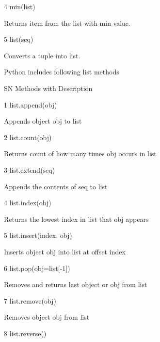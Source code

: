 4 \hspace*{0.5in} min(list) \par
\vspace{12pt}
Returns item from the list with min value. \par
5 \hspace*{0.5in} list(seq) \par
\vspace{12pt}
Converts a tuple into list. \par
Python includes following list methods \par
SN \hspace*{0.5in} Methods with Description \par
1 \hspace*{0.5in} list.append(obj) \par
\vspace{12pt}
Appends object obj to list \par
2 \hspace*{0.5in} list.count(obj) \par
\vspace{12pt}
Returns count of how many times obj occurs in list \par
3 \hspace*{0.5in} list.extend(seq) \par
\vspace{12pt}
Appends the contents of seq to list \par
4 \hspace*{0.5in} list.index(obj) \par
\vspace{12pt}
Returns the lowest index in list that obj appears \par
5 \hspace*{0.5in} list.insert(index, obj) \par
\vspace{12pt}
Inserts object obj into list at offset index \par
6 \hspace*{0.5in} list.pop(obj=list[-1]) \par
\vspace{12pt}
Removes and returns last object or obj from list \par
7 \hspace*{0.5in} list.remove(obj) \par
\vspace{12pt}
Removes object obj from list \par
8 \hspace*{0.5in} list.reverse() \par
